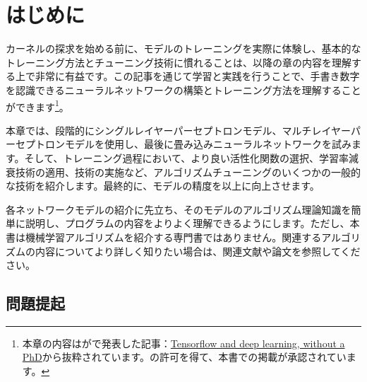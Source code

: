 \begin{savequote}[45mm]
\end{savequote}

\chapter{はじめに} 
\label{ch:ice-breaker}

\begin{content}

\tf{}カーネルの探求を始める前に、モデルのトレーニングを実際に体験し、基本的なトレーニング方法とチューニング技術に慣れることは、以降の章の内容を理解する上で非常に有益です。この記事を通じて学習と実践を行うことで、手書き数字を認識できるニューラルネットワークの構築とトレーニング方法を理解することができます\footnote{本章の内容はがで発表した記事：\href{https://codelabs.developers.google.com/codelabs/cloud-tensorflow-mnist}{Tensorflow and deep learning, without a PhD}から抜粋されています。の許可を得て、本書での掲載が承認されています。}。

本章では、段階的にシングルレイヤーパーセプトロンモデル、マルチレイヤーパーセプトロンモデルを使用し、最後に畳み込みニューラルネットワークを試みます。そして、トレーニング過程において、より良い活性化関数の選択、学習率減衰技術の適用、技術の実施など、アルゴリズムチューニングのいくつかの一般的な技術を紹介します。最終的に、モデルの精度を以上に向上させます。

各ネットワークモデルの紹介に先立ち、そのモデルのアルゴリズム理論知識を簡単に説明し、プログラムの内容をよりよく理解できるようにします。ただし、本書は機械学習アルゴリズムを紹介する専門書ではありません。関連するアルゴリズムの内容についてより詳しく知りたい場合は、関連文献や論文を参照してください。

\end{content}

\section{問題提起}

